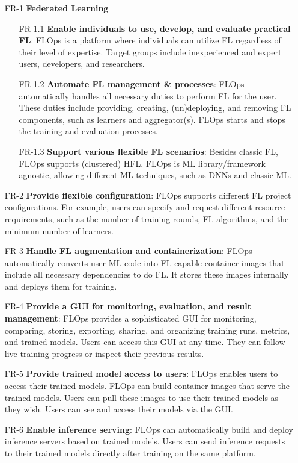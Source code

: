 \begin{itemize}
    \item [FR-1] {\textbf{Federated Learning}}
        \begin{itemize}
        \item [FR-1.1] \textbf{Enable individuals to use, develop, and evaluate practical FL}:
            FLOps is a platform where individuals can utilize FL regardless of their level of expertise.
            Target groups include inexperienced and expert users, developers, and researchers.
        \item [FR-1.2] \textbf{Automate FL management \& processes}:
            FLOps automatically handles all necessary duties to perform FL for the user.
            These duties include providing, creating, (un)deploying, and removing FL components, such as learners and aggregator(s).
            FLOps starts and stops the training and evaluation processes.
        \item [FR-1.3] \textbf{Support various flexible FL scenarios}:
            Besides classic FL, FLOps supports (clustered) HFL.
            FLOps is ML library/framework agnostic, allowing different ML techniques, such as DNNs and classic ML.
        \end{itemize}
    \item [FR-2] {\textbf{Provide flexible configuration}}:
        FLOps supports different FL project configurations.
        For example, users can specify and request different resource requirements, such as the number of training rounds, FL algorithms, and the minimum number of learners.
    \item [FR-3] {\textbf{Handle FL augmentation and containerization}}:
        FLOps automatically converts user ML code into FL-capable container images that include all necessary dependencies to do FL.
        It stores these images internally and deploys them for training.
    \item [FR-4] {\textbf{Provide a GUI for monitoring, evaluation, and result management}}:
        FLOps provides a sophisticated GUI for monitoring, comparing, storing, exporting, sharing, and organizing training runs, metrics, and trained models.
        Users can access this GUI at any time.
        They can follow live training progress or inspect their previous results.
    \item [FR-5] {\textbf{Provide trained model access to users}}:
        FLOps enables users to access their trained models.
        FLOps can build container images that serve the trained models.
        Users can pull these images to use their trained models as they wish.
        Users can see and access their models via the GUI.
    \item [FR-6] {\textbf{Enable inference serving}}:
        FLOps can automatically build and deploy inference servers based on trained models.
        Users can send inference requests to their trained models directly after training on the same platform.
\end{itemize}

